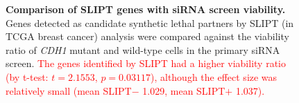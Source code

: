 \begin{figure}[!htbp]
\begin{center}
   \end{center}
   \caption[Comparison of SLIPT genes with siRNA screen viability]{\small \textbf{Comparison of \gls{SLIPT} genes with \gls{siRNA} screen viability.} Genes detected as candidate \gls{synthetic lethal} partners by \gls{SLIPT} (in \gls{TCGA} breast cancer)  analysis were compared against the viability ratio of \textit{CDH1} \gls{mutant} and \gls{wild-type} cells in the primary \gls{siRNA} screen. %
   \textcolor{red}{The genes identified by \gls{SLIPT} had a higher viability ratio (by t-test: $t=2.1553$, $p=0.03117$), although the effect size was relatively small (mean SLIPT$-$ 1.029, mean SLIPT$+$ 1.037).}  %
}
\label{fig:compare_viability_SL}
\end{figure}

